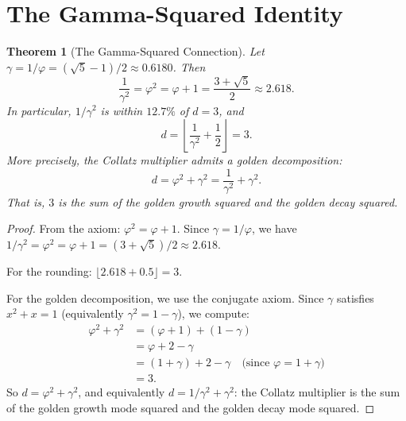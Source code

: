 \documentclass[11pt,a4paper]{article}
\newtheorem{theorem}{Theorem}[section]
\theoremstyle{definition}
\newcommand{\gam}{\gamma}
\begin{document}
\section{The Gamma-Squared Identity}\label{sec:gamma}

\begin{theorem}[The Gamma-Squared Connection]\label{thm:gamma-sq}
Let $\gam = 1/\varphi = (\sqrt{5} - 1)/2 \approx 0.6180$. Then
\begin{equation}\label{eq:gamma-sq}
  \frac{1}{\gam^2} = \varphi^2 = \varphi + 1 = \frac{3 + \sqrt{5}}{2}
  \approx 2.618.
\end{equation}
In particular, $1/\gam^2$ is within $12.7\%$ of $d = 3$, and
\begin{equation}\label{eq:gamma-d}
  d = \left\lfloor \frac{1}{\gam^2} + \frac{1}{2} \right\rfloor = 3.
\end{equation}
More precisely, the Collatz multiplier admits a golden decomposition:
\begin{equation}\label{eq:d-golden}
  d = \varphi^2 + \gam^2 = \frac{1}{\gam^2} + \gam^2.
\end{equation}
That is, $3$ is the sum of the golden growth squared and the golden decay
squared.
\end{theorem}

\begin{proof}
From the axiom: $\varphi^2 = \varphi + 1$. Since $\gam = 1/\varphi$,
we have $1/\gam^2 = \varphi^2 = \varphi + 1 = (3 + \sqrt{5})/2 \approx 2.618$.

For the rounding: $\lfloor 2.618 + 0.5 \rfloor = 3$.

For the golden decomposition, we use the conjugate axiom. Since $\gam$
satisfies $x^2 + x = 1$ (equivalently $\gam^2 = 1 - \gam$), we compute:
\begin{align*}
  \varphi^2 + \gam^2 &= (\varphi + 1) + (1 - \gam) \\
  &= \varphi + 2 - \gam \\
  &= (1 + \gam) + 2 - \gam \quad \text{(since $\varphi = 1 + \gam$)} \\
  &= 3.
\end{align*}
So $d = \varphi^2 + \gam^2$, and equivalently $d = 1/\gam^2 + \gam^2$: the
Collatz multiplier is the sum of the golden growth mode squared and the golden
decay mode squared.
\end{proof}
\end{document}
